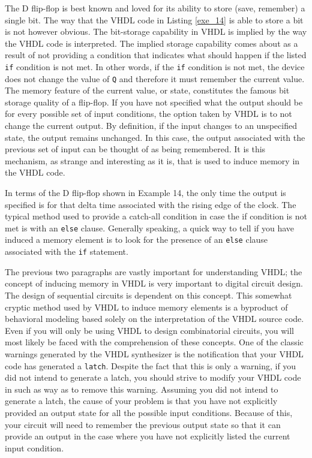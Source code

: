The D flip-flop is best known and loved for its ability to store (save, remember) a single bit. The way that the VHDL code in Listing \ref{exe_14} is able to store a bit is not however obvious. The bit-storage capability in VHDL is implied by the way the VHDL code is interpreted. The implied storage capability comes about as a result of not providing a condition that indicates what should happen if the listed \texttt{if} condition is not met. In other words, if the \texttt{if} condition is not met, the device does not change the value of \texttt{Q} and therefore it must remember the current value. The memory feature of the current value, or state, constitutes the famous bit storage quality of a flip-flop. If you have not specified what the output should be for every possible set of input conditions, the option taken by VHDL is to not change the current output. By definition, if the input changes to an unspecified state, the output remains unchanged. In this case, the output associated with the previous set of input can be thought of as being remembered. It is this mechanism, as strange and interesting as it is, that is used to induce memory in the VHDL code. 

In terms of the D flip-flop shown in Example 14, the only time the output is specified is for that delta time associated with the rising edge of the clock. The typical method used to provide a catch-all condition in case the if condition is not met is with an \texttt{else} clause. Generally speaking, a quick way to tell if you have induced a memory element is to look for the presence of an \texttt{else} clause associated with the \texttt{if} statement. 

The previous two paragraphs are vastly important for understanding VHDL; the concept of inducing memory in VHDL is very important to digital circuit design. The design of sequential circuits is dependent on this concept. This somewhat cryptic method used by VHDL to induce memory elements is a byproduct of behavioral modeling based solely on the interpretation of the VHDL source code. Even if you will only be using VHDL to design combinatorial circuits, you will most likely be faced with the comprehension of these concepts. One of the classic warnings generated by the VHDL synthesizer is the notification that your VHDL code has generated a \texttt{latch}. Despite the fact that this is only a warning, if you did not intend to generate a latch, you should strive to modify your VHDL code in such as way as to remove this warning. Assuming you did not intend to generate a latch, the cause of your problem is that you have not explicitly provided an output state for all the possible input conditions. Because of this, your circuit will need to remember the previous output state so that it can provide an output in the case where you have not explicitly listed the current input condition. 

